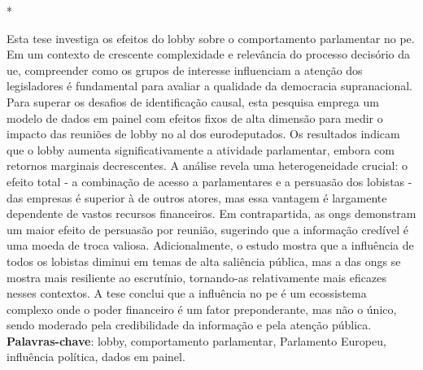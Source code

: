 \documentclass[12pt, a4paper, oneside, chapter=TITLE, subsection=TITLE, section=TITLE, subsubsection=TITLE, subsubsubsection=TITLE, english, german, brazil, hidelinks]{abntex2}
\newcommand{\inserirtermo}[1]{%
}
\begin{document}
    \pretextual

    \imprimircapa
    \imprimirfolhaderosto[]*
    \cleardoublepage


    \inserirtermo{ATA DEFESA - Termo de Aprovação.pdf}

    
    \cleardoublepage

    \begin{resumo}[Resumo]
        Esta tese investiga os efeitos do lobby sobre o comportamento parlamentar no \acrfull{pe}. Em um contexto de crescente complexidade e relevância do processo decisório da \acrfull{ue}, compreender como os grupos de interesse influenciam a atenção dos legisladores é fundamental para avaliar a qualidade da democracia supranacional. Para superar os desafios de identificação causal, esta pesquisa emprega um modelo de dados em painel com efeitos fixos de alta dimensão para medir o impacto das reuniões de lobby no \acrfull{al} dos eurodeputados. Os resultados indicam que o lobby aumenta significativamente a atividade parlamentar, embora com retornos marginais decrescentes. A análise revela uma heterogeneidade crucial: o efeito total - a combinação de acesso a parlamentares e a persuasão dos lobistas - das empresas é superior à de outros atores, mas essa vantagem é largamente dependente de vastos recursos financeiros. Em contrapartida, as \acrshort{ong}s demonstram um maior efeito de persuasão por reunião, sugerindo que a informação credível é uma moeda de troca valiosa. Adicionalmente, o estudo mostra que a influência de todos os lobistas diminui em temas de alta saliência pública, mas a das \acrshort{ong}s se mostra mais resiliente ao escrutínio, tornando-as relativamente mais eficazes nesses contextos. A tese conclui que a influência no \acrshort{pe} é um ecossistema complexo onde o poder financeiro é um fator preponderante, mas não o único, sendo moderado pela credibilidade da informação e pela atenção pública. \\
        \noindent
        \textbf{Palavras-chave}: lobby, comportamento parlamentar, Parlamento Europeu, influência política, dados em painel.
    \end{resumo}
    
\end{document}
